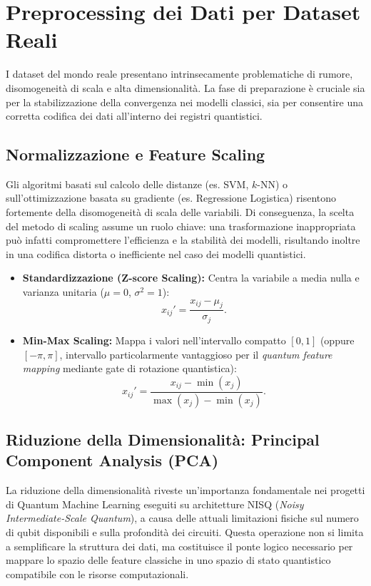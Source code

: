 \section{Preprocessing dei Dati per Dataset Reali}
I dataset del mondo reale presentano intrinsecamente problematiche di rumore, disomogeneità di scala e alta dimensionalità. La fase di preparazione è cruciale sia per la stabilizzazione della convergenza nei modelli classici, sia per consentire una corretta codifica dei dati all'interno dei registri quantistici.

\subsection{Normalizzazione e Feature Scaling}
Gli algoritmi basati sul calcolo delle distanze (es. SVM, $k$-NN) o sull'ottimizzazione basata su gradiente (es. Regressione Logistica) risentono fortemente della disomogeneità di scala delle variabili. Di conseguenza, la scelta del metodo di scaling assume un ruolo chiave: una trasformazione inappropriata può infatti compromettere l'efficienza e la stabilità dei modelli, risultando inoltre in una codifica distorta o inefficiente nel caso dei modelli quantistici.

\begin{itemize}
    \item \textbf{Standardizzazione (Z-score Scaling):} Centra la variabile a media nulla e varianza unitaria ($\mu = 0$, $\sigma^2 = 1$):
    \begin{equation}
    x_{ij}' = \frac{x_{ij} - \mu_j}{\sigma_j}.
    \end{equation}
    \item \textbf{Min-Max Scaling:} Mappa i valori nell'intervallo compatto $[0, 1]$ (oppure $[-\pi, \pi]$, intervallo particolarmente vantaggioso per il \textit{quantum feature mapping} mediante gate di rotazione quantistica):
    \begin{equation}
    x_{ij}' = \frac{x_{ij} - \min(x_j)}{\max(x_j) - \min(x_j)}.
    \end{equation}
\end{itemize}

\subsection{Riduzione della Dimensionalità: Principal Component Analysis (PCA)}
La riduzione della dimensionalità riveste un'importanza fondamentale nei progetti di Quantum Machine Learning eseguiti su architetture NISQ (\textit{Noisy Intermediate-Scale Quantum}), a causa delle attuali limitazioni fisiche sul numero di qubit disponibili e sulla profondità dei circuiti. Questa operazione non si limita a semplificare la struttura dei dati, ma costituisce il ponte logico necessario per mappare lo spazio delle feature classiche in uno spazio di stato quantistico compatibile con le risorse computazionali.

